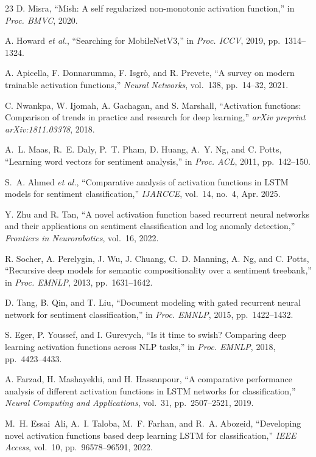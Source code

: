 \documentclass[conference,a4paper]{IEEEtran}
\begin{document}
{\begin{thebibliography}{23}
D. Misra,
``Mish: A self regularized non-monotonic activation function,''
in \textit{Proc. BMVC}, 2020.

A. Howard \textit{et al.},
``Searching for MobileNetV3,''
in \textit{Proc. ICCV}, 2019, pp.~1314--1324.

A. Apicella, F. Donnarumma, F. Isgr\`{o}, and R. Prevete,
``A survey on modern trainable activation functions,''
\textit{Neural Networks}, vol.~138, pp.~14--32, 2021.

C. Nwankpa, W. Ijomah, A. Gachagan, and S. Marshall,
``Activation functions: Comparison of trends in practice and research for
deep learning,''
\textit{arXiv preprint arXiv:1811.03378}, 2018.


A.~L. Maas, R.~E. Daly, P.~T. Pham, D. Huang, A.~Y. Ng, and C. Potts,
``Learning word vectors for sentiment analysis,''
in \textit{Proc. ACL}, 2011, pp.~142--150.

S.~A. Ahmed \textit{et al.},
``Comparative analysis of activation functions in LSTM models for sentiment
classification,''
\textit{IJARCCE}, vol.~14, no.~4, Apr. 2025.

Y. Zhu and R. Tan,
``A novel activation function based recurrent neural networks and their
applications on sentiment classification and log anomaly detection,''
\textit{Frontiers in Neurorobotics}, vol.~16, 2022.

R. Socher, A. Perelygin, J. Wu, J. Chuang, C.~D. Manning, A. Ng,
and C. Potts,
``Recursive deep models for semantic compositionality over a sentiment
treebank,''
in \textit{Proc. EMNLP}, 2013, pp.~1631--1642.

D. Tang, B. Qin, and T. Liu,
``Document modeling with gated recurrent neural network for sentiment
classification,''
in \textit{Proc. EMNLP}, 2015, pp.~1422--1432.


S. Eger, P. Youssef, and I. Gurevych,
``Is it time to swish? Comparing deep learning activation functions across
NLP tasks,''
in \textit{Proc. EMNLP}, 2018, pp.~4423--4433.

A. Farzad, H. Mashayekhi, and H. Hassanpour,
``A comparative performance analysis of different activation functions in
LSTM networks for classification,''
\textit{Neural Computing and Applications}, vol.~31,
pp.~2507--2521, 2019.

M.~H. Essai~Ali, A.~I. Taloba, M.~F. Farhan, and R.~A. Abozeid,
``Developing novel activation functions based deep learning LSTM for
classification,''
\textit{IEEE Access}, vol.~10, pp.~96578--96591, 2022.

\end{thebibliography}
}
\end{document}
